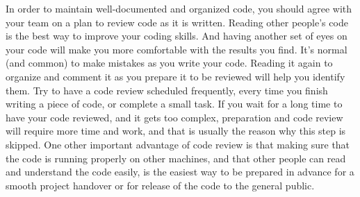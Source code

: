 \documentclass[
]{book}
\begin{document}
In order to maintain well-documented and organized code,
you should agree with your team on a plan to review code as it is written.
Reading other people's code is the best way to improve your coding skills.
And having another set of eyes on your code will make you more comfortable with the results you find.
It's normal (and common) to make mistakes as you write your code.
Reading it again to organize and comment it as you prepare it to be reviewed will help you identify them.
Try to have a code review scheduled frequently,
every time you finish writing a piece of code, or complete a small task.
If you wait for a long time to have your code reviewed, and it gets too complex,
preparation and code review will require more time and work,
and that is usually the reason why this step is skipped.
One other important advantage of code review is that
making sure that the code is running properly on other machines,
and that other people can read and understand the code easily,
is the easiest way to be prepared in advance for a smooth project handover
or for release of the code to the general public.
\end{document}
